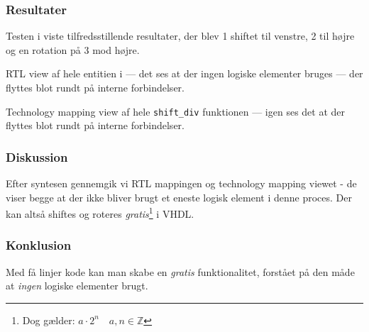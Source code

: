 \subsubsection{Resultater}
Testen i  viste tilfredsstillende resultater, der blev 1 shiftet til venstre, 2 til højre og en rotation på 3 mod højre.

{RTL view af hele entitien i  --- det ses at der ingen logiske elementer bruges --- der flyttes blot rundt på interne forbindelser.}


{Technology mapping view af hele \texttt{shift\_div} funktionen --- igen ses det at der flyttes blot rundt på interne forbindelser.}




\subsubsection{Diskussion}

Efter syntesen gennemgik vi RTL mappingen og technology mapping viewet - de viser begge at der ikke bliver brugt et eneste logisk element i denne proces. Der kan altså shiftes og roteres \emph{gratis}\footnote{Dog gælder: $a\cdot 2^n \quad a, n \in \mathbb{Z}$} i VHDL.

\subsubsection{Konklusion}

Med få linjer kode kan man skabe en \emph{gratis} funktionalitet, forstået på den måde at \textit{ingen} logiske elementer brugt.
